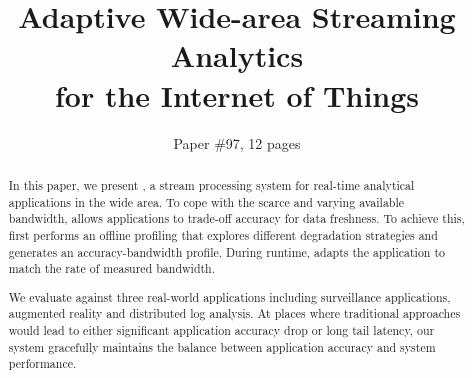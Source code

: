 \documentclass{sig-alternate-10pt}
\begin{document}



\title{Adaptive Wide-area Streaming Analytics \\ for the Internet of Things}

\author{ \alignauthor Paper \#97, 12 pages }

\maketitle

\begin{abstract}
  In this paper, we present \sysname{}, a stream processing system for real-time
  analytical applications in the wide area. To cope with the scarce and varying
  available bandwidth, \sysname{} allows applications to trade-off accuracy for
  data freshness. To achieve this, \sysname{} first performs an offline
  profiling that explores different degradation strategies and generates an
  accuracy-bandwidth profile. During runtime, \sysname{} adapts the application
  to match the rate of measured bandwidth.

  We evaluate \sysname{} against three real-world applications including
  surveillance applications, augmented reality and distributed log analysis. At
  places where traditional approaches would lead to either significant
  application accuracy drop or long tail latency, our system gracefully
  maintains the balance between application accuracy and system performance.
\end{abstract}







% 






{}
\end{document}
